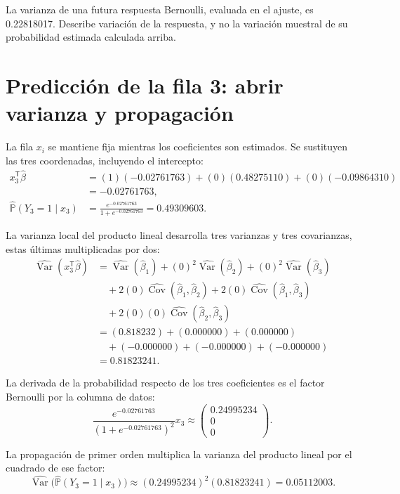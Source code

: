 \documentclass[11pt,a4paper]{article}
\newcommand{\Prob}{\mathbb P}
\newcommand{\T}{^{\mathsf T}}
\DeclareMathOperator{\Var}{Var}
\DeclareMathOperator{\Cov}{Cov}
\begin{document}
La varianza de una futura respuesta Bernoulli,
evaluada en el ajuste, es 0.22818017.
Describe variación de la respuesta, y no la variación
muestral de su probabilidad estimada calculada arriba.
\endgroup

\clearpage
\section{Predicción de la fila 3: abrir varianza y propagación}\label{logit112}
\begingroup\small
\setlength{\abovedisplayskip}{4pt}\setlength{\belowdisplayskip}{4pt}
La fila \(x_i\) se mantiene fija mientras los coeficientes
son estimados. Se sustituyen las tres coordenadas,
incluyendo el intercepto:
\[
\begin{aligned}
x_{3}\T\widehat\beta&=(1)(-0.02761763)+(0)(0.48275110)+(0)(-0.09864310)\\&=-0.02761763,\\\widehat{\Prob}(Y_{3}=1\mid x_{3})&=\frac{e^{-0.02761763}}{1+e^{-0.02761763}}=0.49309603.\end{aligned}
\]

La varianza local del producto lineal desarrolla tres varianzas
y tres covarianzas, estas últimas multiplicadas por dos:
\[
\begin{aligned}
\widehat{\Var}(x_{3}\T\widehat\beta)&=\widehat{\Var}(\widehat\beta_1)+(0)^2\widehat{\Var}(\widehat\beta_2)+(0)^2\widehat{\Var}(\widehat\beta_3)\\&\quad+2(0)\widehat{\Cov}(\widehat\beta_1,\widehat\beta_2)+2(0)\widehat{\Cov}(\widehat\beta_1,\widehat\beta_3)\\&\quad+2(0)(0)\widehat{\Cov}(\widehat\beta_2,\widehat\beta_3)\\&=(0.818232)+(0.000000)+(0.000000)\\&\quad+(-0.000000)+(-0.000000)+(-0.000000)\\&=0.81823241.\end{aligned}
\]

La derivada de la probabilidad respecto de los tres coeficientes
es el factor Bernoulli por la columna de datos:
\[
\frac{e^{-0.02761763}}{(1+e^{-0.02761763})^2}x_{3}\approx\begin{pmatrix}0.24995234\\0\\0\end{pmatrix}.
\]

La propagación de primer orden multiplica la varianza del
producto lineal por el cuadrado de ese factor:
\[
\widehat{\Var}\bigl(\widehat{\Prob}(Y_{3}=1\mid x_{3})\bigr)\approx(0.24995234)^2(0.81823241)=0.05112003.
\]
\end{document}
